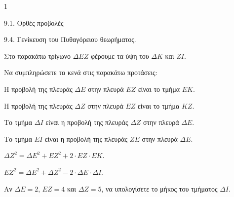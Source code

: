 \begin{ylh}{1}
    \item 9.1. Ορθές προβολές
    \item 9.4. Γενίκευση του Πυθαγόρειου θεωρήματος.
\end{ylh}
\begin{figure}
    \centering
\end{figure}
Στο παρακάτω τρίγωνο $\Delta EZ$ φέρουμε τα ύψη του $\Delta K$ και $ZI$.
\begin{alist}
    \item Να συμπληρώσετε τα κενά στις παρακάτω προτάσεις: 
    \begin{rlist}
        \item Η προβολή της πλευράς $\Delta E$ στην πλευρά $EZ$ είναι το τμήμα $EK$.
        \item Η προβολή της πλευράς $\Delta Z$ στην πλευρά $EZ$ είναι το τμήμα $KZ$.
        \item Το τμήμα $\Delta I$ είναι η προβολή της πλευράς $\Delta Z$ στην πλευρά $\Delta E$.
        \item Το τμήμα $EI$ είναι η προβολή της πλευράς $ZE$ στην πλευρά $\Delta E$.
        \item $\Delta Z^2 = \Delta E^2 + EZ^2 + 2 \cdot EZ \cdot EK$.
        \item $EZ^2 = \Delta E^2 + \Delta Z^2 - 2 \cdot \Delta E \cdot \Delta I$.
    \end{rlist}
    \item Αν $\Delta E = 2$, $EZ = 4$ και $\Delta Z = 5$, να υπολογίσετε το μήκος του τμήματος $\Delta I$. 
\end{alist}